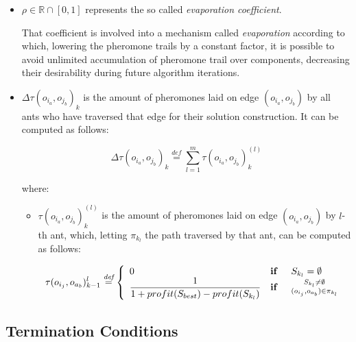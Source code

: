 \documentclass[12pt,a4paper]{report}
\newcommand{\mathDef}{\overset{\textit{def}}{=}}
\begin{document}
\begin{itemize}
	
	\item $\rho \in \mathbb{R} \cap \left[0,1\right]$ represents the so called \textit{evaporation coefficient}. 
	
	That coefficient is involved into a mechanism called \textit{evaporation} according to which, lowering the pheromone trails by a constant factor, it is possible to avoid unlimited accumulation of pheromone trail over components, decreasing their desirability during future algorithm iterations.
	
	\item $\Delta \tau(o_{i_a}, o_{j_b})_{k}$ is the amount of pheromones laid on edge $(o_{i_a}, o_{j_b})$ by all ants who have traversed that edge for their solution construction. It can be computed as follows:
	
	\begin{equation}
		\Delta \tau(o_{i_a}, o_{j_b})_{k} \mathDef \sum_{l=1}^{m} \tau(o_{i_a}, o_{j_b})_k^{(l)}
	\end{equation}
	
	where: 
	
	\begin{itemize}
		\item $\tau(o_{i_a}, o_{j_b})_k^{(l)}$ is the amount of pheromones laid on edge $(o_{i_a}, o_{j_b})$ by $l$-th ant, which, letting $\pi_{k_l}$ the path traversed by that ant, can be computed as follows:
		
		\begin{equation}
			\tau(o_{i_j}, o_{a_b})_{k-1}^{l} \mathDef \left\{ 
			\begin{array}{lll}
				0 & \text{\textbf{if }} & S_{k_l} = \emptyset \\ 
				\displaystyle \frac{1}{1 + profit(S_{best}) - profit(S_{k_l})} & \text{\textbf{if }} & \substack{S_{k_l} \neq \emptyset \\ (o_{i_j}, o_{a_b}) \in \pi_{k_l}} \\ 
			\end{array} \right.
		\end{equation}
		
	\end{itemize}
\end{itemize}

\subsection{Termination Conditions}
\end{document}

